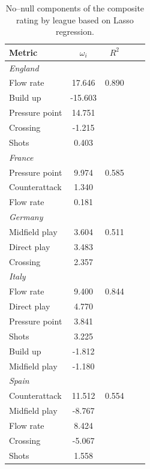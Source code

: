 \documentclass[preprint,12pt]{elsarticle}
\begin{document}
\begin{table}[htbp]
\centering
\caption{No--null components of the composite rating by league based on Lasso regression.}
\label{tab:CR}
\normalsize %
%
\begin{tabular}{lcccc}
\toprule
\textbf{Metric} & \textbf{$\omega_i$} & \textbf{$R^2$} \\
\midrule
\multicolumn{3}{l}{ \textit{England}} \\ 
Flow rate & 17.646 & 0.890 \\ 
Build up & -15.603 &  \\ 
Pressure point & 14.751 &  \\ 
Crossing & -1.215 &  \\ 
Shots & 0.403 &  \\ 
\midrule\multicolumn{3}{l}{ \textit{France}} \\ 
Pressure point & 9.974 & 0.585 \\ 
Counterattack & 1.340 &  \\ 
Flow rate & 0.181 &  \\ 
\midrule\multicolumn{3}{l}{ \textit{Germany}} \\ 
Midfield play & 3.604 & 0.511 \\ 
Direct play & 3.483 &  \\ 
Crossing & 2.357 &  \\ 
\midrule\multicolumn{3}{l}{ \textit{Italy}} \\ 
Flow rate & 9.400 & 0.844 \\ 
Direct play & 4.770 &  \\ 
Pressure point & 3.841 &  \\ 
Shots & 3.225 &  \\ 
Build up & -1.812 &  \\ 
Midfield play & -1.180 &  \\ 
\midrule\multicolumn{3}{l}{ \textit{Spain}} \\ 
Counterattack & 11.512 & 0.554 \\ 
Midfield play & -8.767 &  \\ 
Flow rate & 8.424 &  \\ 
Crossing & -5.067 &  \\ 
Shots & 1.558 &  \\ 
\midrule
\bottomrule
\end{tabular}
%
\end{table}
\end{document}
